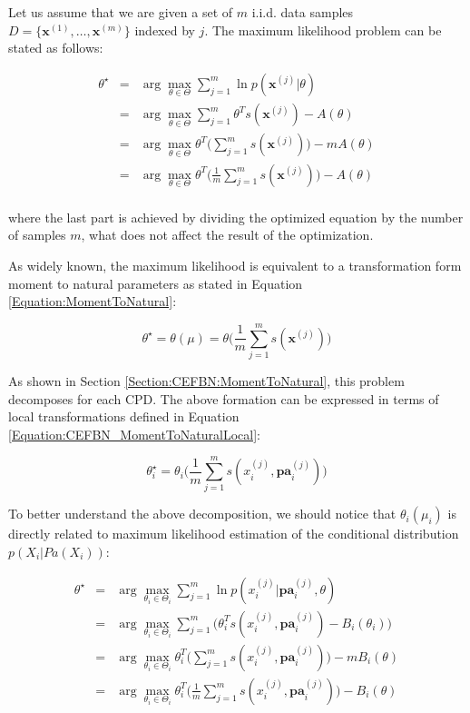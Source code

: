 \documentclass[11pt, oneside]{article}   	%
\newcommand{\bm}{\mathbf}
\numberwithin{figure}{section}
\numberwithin{equation}{section}
\numberwithin{table}{section}
\theoremstyle{definition}
\begin{document}
Let us assume that we are given a set of $m$ i.i.d. data samples $D=\{\bm x^{(1)}, \ldots, \bm x^{(m)}\}$ indexed by $j$. The maximum likelihood problem can be stated as follows:

\begin{eqnarray*}
\theta^\star  &=& \arg\max_{\theta \in \Theta} \sum_{j=1}^m \ln p(\bm x^{(j)}|\theta) \\
&=& \arg\max_{\theta \in \Theta} \sum_{j=1}^m \theta^Ts(\bm x^{(j)})  - A(\theta) \\
&=& \arg\max_{\theta \in \Theta} \theta^T\Big(\sum_{j=1}^m s(\bm x^{(j)})\Big)  - m A(\theta) \\
&=& \arg\max_{\theta \in \Theta} \theta^T\Big(\frac{1}{m}\sum_{j=1}^m s(\bm x^{(j)})\Big)  - A(\theta) \\
\end{eqnarray*}

\noindent where the last part is achieved by dividing the optimized equation by the number of samples $m$, what does not affect the result of the optimization. 

As widely known, the maximum likelihood is equivalent to a transformation form moment to natural parameters as stated in Equation \ref{Equation:MomentToNatural}: 

$$\theta^\star = \theta (\mu) = \theta\Big(\frac{1}{m}\sum_{j=1}^m s(\bm x^{(j)})\Big)$$

As shown in Section \ref{Section:CEFBN:MomentToNatural}, this problem decomposes for each CPD. The above formation can be expressed in terms of local transformations defined in Equation \ref{Equation:CEFBN_MomentToNaturalLocal}:

$$\theta_i^\star = \theta_i\Big(\frac{1}{m}\sum_{j=1}^m s(x_i^{(j)},\bm{pa}^{(j)}_i)\Big)$$

To better understand the above decomposition, we should notice that $\theta_i(\mu_i)$ is directly related to maximum likelihood estimation of the conditional distribution $p(X_i|Pa(X_i))$:

\begin{eqnarray*}
\theta^\star  &=& \arg\max_{\theta_i \in \Theta_i} \sum_{j=1}^m \ln p(x_i^{(j)}|\bm{pa}^{(j)}_i,\theta) \\
&=& \arg\max_{\theta_i \in \Theta_i} \sum_{j=1}^m \Big(\theta_i^Ts(x_i^{(j)},\bm{pa}^{(j)}_i)  - B_i(\theta_i) \Big)\\
&=& \arg\max_{\theta_i \in \Theta_i} \theta_i^T\Big(\sum_{j=1}^m s(x_i^{(j)},\bm{pa}^{(j)}_i) \Big)  - m B_i(\theta) \\
&=& \arg\max_{\theta_i \in \Theta_i} \theta_i^T\Big(\frac{1}{m}\sum_{j=1}^m s(x_i^{(j)},\bm{pa}^{(j)}_i) \Big)  - B_i(\theta) \\
\end{eqnarray*}
\end{document}
